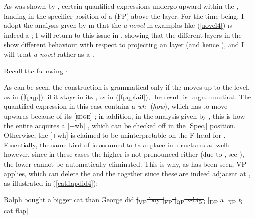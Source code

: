 As was shown by \citet[124--130]{kennedymerchant2000}, certain quantified expressions undergo upward  within the , landing in the specifier position of a  (FP) above the  layer. For the time being, I adopt the analysis given by \citet{kennedymerchant2000} in that the  \textit{a novel} in examples like (\ref{novel4}) is indeed a ; I will return to this issue in , showing that the different layers in the  show different behaviour with respect to projecting an  layer (and hence ), and I will treat \textit{a novel} rather as a . 

Recall the following :

\ea \label{novel4}
 \label{fpqp}
 \label{fpqpfail}
\z
\z

As can be seen, the construction is grammatical only if the  moves up to the  level, as in (\ref{fpqp}): if it stays in its , as in (\ref{fpqpfail}), the result is ungrammatical. The quantified expression in this case contains a \textit{wh}- (\textit{how}), which has to move upwards because of its [\textsc{edge}] ; in addition, in the analysis given by \citet{kennedymerchant2000}, this is how the entire  acquires a [+wh] , which can be checked off in the [Spec,] position. Otherwise, the [+wh]  is claimed to be uninterpretable on the F head for . Essentially, the same kind of  is assumed to take place in  structures as well: however, since in these cases the higher  is not pronounced either (due to , see ), the lower  cannot be automatically eliminated. This is why, as has been seen, VP- applies, which can delete the  and the  together since these are indeed adjacent at , as illustrated in (\ref{catflapdid4}):

\ea	Ralph bought a bigger cat than George did \sout{[\textsubscript{VP} buy [\textsubscript{FP} [\textsubscript{QP} x-big]\textsubscript{i} }[\textsubscript{DP} a [\textsubscript{NP} \emph{t}\textsubscript{i} cat flap]]]]. \label{catflapdid4}
\z

